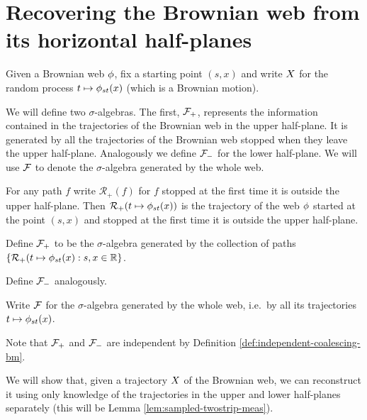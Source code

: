 \newcommand{\toinP}{\overset{\P}\to}
\newcommand{\statementoflemresampledetosampled}{$\resamplede \toinP \sampled$ as $\epsilon \to 0$}
{
\section{Recovering the Brownian web from its horizontal half-planes}

\label{recovering-from-half-planes}

\begin{notation}
Given a Brownian web $\phi$, fix a starting point $(s,x)$ and write
$X$ for the random process $t \mapsto \phi_{{s}{t}}(x)$
(which is a Brownian motion).
\end{notation}

\newcommand{\restrictupper}{\mathcal{R}_{+}}

We will define two $\sigma$-algebras.  The first, $\mathcal{F}_{+}$,
represents the information contained in the trajectories of the
Brownian web in the upper half-plane.  It is generated by all the
trajectories of the Brownian web stopped when they leave the upper
half-plane.  Analogously we define $\mathcal{F}_{-}$ for the lower
half-plane.  We will use $\mathcal{F}$ to denote the
$\sigma$-algebra generated by the whole web.

\begin{definition}
  For any path $f$ write $\restrictupper(f)$ for $f$ stopped at the
  first time it is outside the upper half-plane.  Then
  $\restrictupper(t \mapsto \web{s}{t}{x})$ is the trajectory of the
  web $\phi$ started at the point $(s,x)$ and stopped at the first
  time it is outside the upper half-plane.

  Define $\mathcal{F}_{+}$ to be the $\sigma$-algebra generated by the
  collection of paths $\{\restrictupper(t \mapsto \web{s}{t}{x} : s,x
  \in \R \}$.

  Define $\mathcal{F}_{-}$ analogously.

  Write $\mathcal{F}$ for the $\sigma$-algebra generated by the
  whole web, i.e.\ by all its trajectories $t \mapsto \phi_{{s}{t}}(x)$.
\end{definition}

\begin{observation}
  Note that $\mathcal{F}_{+}$ and $\mathcal{F}_{-}$ are independent by Definition
  \ref{def:independent-coalescing-bm}.
\end{observation}

We will show that, given a trajectory $X$ of the Brownian web,
we can reconstruct it using only knowledge of the trajectories in the
upper and lower half-planes separately (this will be Lemma
\ref{lem:sampled-twostrip-meas}).

}
